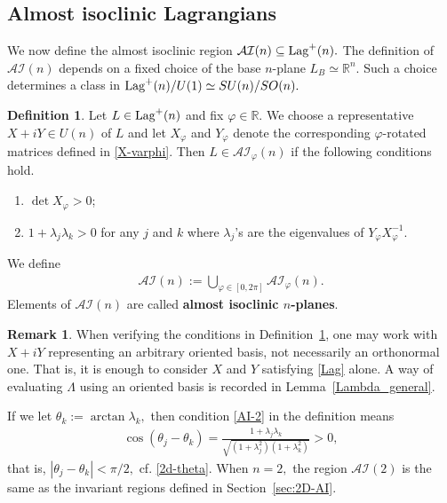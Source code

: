 \documentclass[11pt]{amsart}
\numberwithin{equation}{section}
\theoremstyle{definition}
\theoremstyle{definition}
\newtheorem{definition}[equation]{Definition}
\newtheorem{remark}[equation]{Remark}
\newcommand{\bb}[1]{\mathbb{#1}} \newcommand{\td}[1]{\widetilde{#1}}
\newcommand{\sbst}{\subseteq}
\begin{document}
\subsection{Almost isoclinic Lagrangians} 

We now define the almost isoclinic region $\mathcal{AI}(n)\sbst{\rm Lag}^+(n).$ 
The definition of $\mathcal{AI}(n)$ depends on a fixed choice of the base $n$-plane $L_B\simeq\bb R^n.$ 
Such a choice determines a class in ${\rm Lag}^+(n)/{U}(1)\simeq {SU}(n)/{SO}(n).$


\begin{definition}\label{def:AI}
	Let $L\in{\rm Lag}^+(n)$ and fix \(\varphi \in \mathbb{R}\). 
	We choose a representative $X+iY\in U(n)$ of \(L\) and let \(X_{\varphi}\) and \(Y_{\varphi}\) denote the corresponding $\varphi$-rotated matrices defined in \eqref{X-varphi}. 
	Then $L\in\mathcal{AI}_{\varphi}(n)$ if the following conditions hold.
	\begin{enumerate}
		\item \label{AI-1}
		\(\det X_{\varphi}>0\);
		\item \label{AI-2}
		$1+\lambda_j\lambda_k>0$ for any $j$ and $k$ where $\lambda_j$'s are the eigenvalues of $Y_\varphi X_\varphi^{-1}.$
	\end{enumerate}
	We define
	\begin{align*}
	\mathcal{AI}(n)
	:=
	\bigcup_{\varphi \in [0,2\pi]}
	\mathcal{AI}_{\varphi}(n).
	\end{align*}
	Elements of \(\mathcal{AI}(n)\) are called {\bf almost isoclinic $n$-planes}.
\end{definition}

\begin{remark}
\label{rmk:general-matrices-for-AI}
    When verifying the conditions in Definition~\ref{def:AI}, one may work with $X+iY$ representing an arbitrary oriented basis, not necessarily an  orthonormal one.
    That is, it is enough to consider $X$ and $Y$ satisfying \eqref{Lag} alone. 
    A way of evaluating $\Lambda$ using an oriented basis is recorded in Lemma~\ref{Lambda_general}.
\end{remark}


If we let $\theta_k:=\arctan\lambda_k,$ then condition \eqref{AI-2} in the definition means
\begin{align*}
\cos(\theta_j-\theta_k)
= \frac{1+\lambda_j\lambda_k}{\sqrt{(1+\lambda_j^2)(1+\lambda_k^2)}}
>0,
\end{align*}
that is, $|\theta_j-\theta_k|<\pi/2,$ cf. \eqref{2d-theta}.
When $n=2,$ the region $\mathcal{AI}(2)$ is the same as the invariant regions defined in Section~\ref{sec:2D-AI}.
\end{document}
